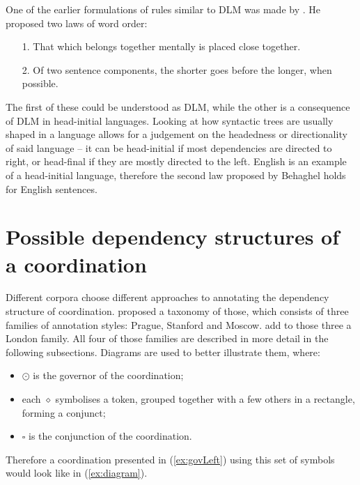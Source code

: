 One of the earlier formulations of rules similar to DLM was made by \cite{behaghel}. He proposed two laws of word order:

\begin{itemize}
    \item[1.] That which belongs together mentally is placed close together.
    \item[2.] Of two sentence components, the shorter goes before the longer, when possible.
\end{itemize}

The first of these could be understood as DLM, while the other is a consequence of DLM in head-initial languages. Looking at how syntactic trees are usually shaped in a language allows for a judgement on the headedness or directionality of said language -- it can be head-initial if most dependencies are directed to right, or head-final if they are mostly directed to the left. English is an example of a head-initial language, therefore the second law proposed by Behaghel holds for English sentences. 

\section{Possible dependency structures of a coordination}\label{sec:coord annotations}

Different corpora choose different approaches to annotating the dependency structure of coordination. \cite{popel2013coordination} proposed a taxonomy of those, which consists of three families of annotation styles: Prague, Stanford and Moscow. \cite{prz:woz:23} add to those three a London family. All four of those families are described in more detail in the following subsections. Diagrams are used to better illustrate them, where:
\begin{itemize}
    \item $\odot$ is the governor of the coordination;
    \item each $\diamond$ symbolises a token, grouped together with a few others in a rectangle, forming a conjunct;
    \item $\square$ is the conjunction of the coordination.
\end{itemize}

Therefore a coordination presented in (\ref{ex:govLeft}) using this set of symbols would look like in (\ref{ex:diagram}).


